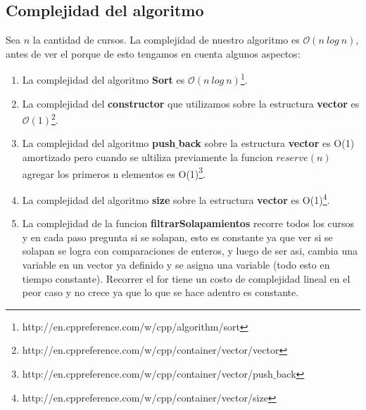 \subsection{Complejidad del algoritmo}

Sea $n$ la cantidad de cursos. La complejidad de nuestro algoritmo es $\mathcal{O}(n\ log\ n)$, antes de ver el porque de esto tengamos en cuenta algunos aspectos:
\begin{enumerate}
\item La complejidad del algoritmo \textbf{Sort} es $\mathcal{O}(n\ log\ n)$\footnote{http://en.cppreference.com/w/cpp/algorithm/sort}.
\item La complejidad del \textbf{constructor} que utilizamos sobre la estructura \textbf{vector} es $\mathcal{O}(1)$\footnote{http://en.cppreference.com/w/cpp/container/vector/vector}.
\item La complejidad del algoritmo \textbf{push$\_$back} sobre la estructura \textbf{vector} es O(1) amortizado pero cuando se ultiliza previamente la funcion $reserve(n)$ agregar los primeros n elementos es O(1)\footnote{http://en.cppreference.com/w/cpp/container/vector/push$\_$back}. 
\item La complejidad del algoritmo \textbf{size} sobre la estructura \textbf{vector} es O(1)\footnote{http://en.cppreference.com/w/cpp/container/vector/size}.
\item La complejidad de la funcion \textbf{filtrarSolapamientos} recorre todos los cursos y en cada paso pregunta si se solapan, esto es constante ya que ver si se solapan se logra con comparaciones de enteros, y luego de ser asi, cambia una variable en un vector ya definido y se asigna una variable (todo esto en tiempo constante). Recorrer el for tiene un costo de complejidad lineal en el peor caso y no crece ya que lo que se hace adentro es constante.
\end{enumerate}






